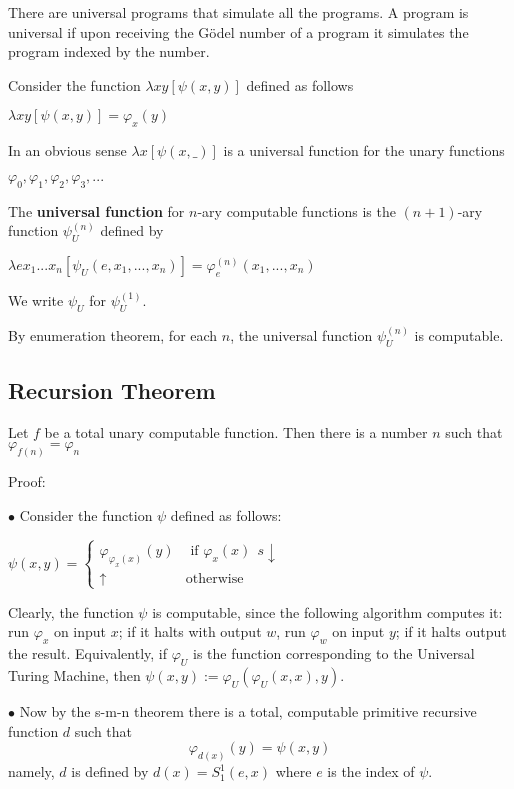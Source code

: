 There are universal programs that simulate all the programs. A program is universal if upon receiving the Gödel number of a program it simulates the program indexed by the number.

Consider the function $\lambda xy[\psi (x,y)]$ defined as follows
\begin{center}
	$
	\lambda xy[\psi (x,y)]= \varphi_x(y)
	$
\end{center}
In an obvious sense $\lambda x[\psi (x,\_)]$ is a universal function for the unary functions
\begin{center}
	$
	\varphi_0, \varphi_1,\varphi_2,\varphi_3,...
	$
\end{center}
The \textbf{universal function} for $n$-ary computable functions is the $(n+1)$-ary function $\psi_U^{(n)}$ defined by
\begin{center}
	$
	\lambda ex_1...x_n[\psi_U(e, x_1, ...,x_n)] = \varphi_e^{(n)}(x_1,...,x_n)
	$
\end{center}
We write $\psi_U$ for $\psi_U^{(1)}$.

By enumeration theorem, for each $n$, the universal function $\psi_U^{(n)}$ is computable.

\subsection{Recursion Theorem}
Let $f$ be a total unary computable function. 
Then there is a number $n$ such that $\varphi_{f(n)} = \varphi_n$

Proof:

$\bullet$ Consider the function $\psi$ defined as follows:
\begin{center}
	$
	\psi(x,y)=
	\begin{cases}
		\varphi_{\varphi_{x}(x)}(y)	&\text{ if $\varphi_x(x)~~s\downarrow$}\\
		\uparrow								&\text{otherwise}
	\end{cases}
	$
\end{center}

Clearly, the function $\psi$ is computable, since the following algorithm computes it: run $\varphi_x$ on input $x$; if it halts with output $w$, run $\varphi_w$ on input $y$; if it halts output the result. Equivalently, if $\varphi_U$ is the function corresponding to the Universal Turing Machine, then $\psi(x,y):=\varphi_U(\varphi_U(x,x),y)$.

$\bullet$ Now by the s-m-n theorem there is a total, computable primitive recursive function $d$ such that
$$	\varphi_{d(x)}(y) = \psi(x,y) $$
namely, $d$ is defined by $d(x)= S_1^1(e,x)$ where $e$ is the index of $\psi$.

